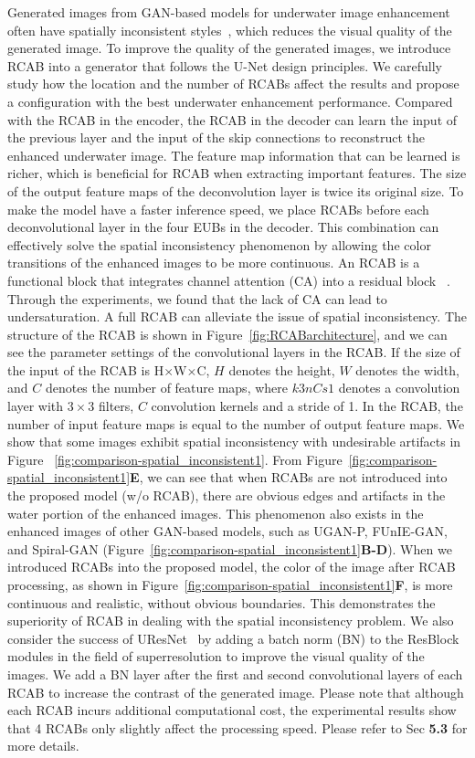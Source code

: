 \documentclass[utf8]{FrontiersinHarvard} %
\begin{document}
Generated images from GAN-based models for underwater image enhancement often have spatially inconsistent styles~\citep{2021LAFFNet}, which reduces the visual quality of the generated image. To improve the quality of the generated images, we introduce RCAB into a generator that follows the U-Net design principles. We carefully study how the location and the number of RCABs affect the results and propose a configuration with the best underwater enhancement performance. Compared with the RCAB in the encoder, the RCAB in the decoder can learn the input of the previous layer and the input of the skip connections to reconstruct the enhanced underwater image. The feature map information that can be learned is richer, which is beneficial for RCAB when extracting important features. 
The size of the output feature maps of the deconvolution layer is twice its original size. To make the model have a faster inference speed, we place RCABs before each deconvolutional layer in the four EUBs in the decoder. This combination can effectively solve the spatial inconsistency phenomenon by allowing the color transitions of the enhanced images to be more continuous. An RCAB is a functional block that integrates channel attention (CA) into a residual block ~\citep{zhang2018image}. Through the experiments, we found that the lack of CA can lead to undersaturation. A full RCAB can alleviate the issue of spatial inconsistency. The structure of the RCAB is shown in Figure~\ref{fig:RCABarchitecture}, and we can see the parameter settings of the convolutional layers in the RCAB. If the size of the input of the RCAB is H$\times$W$\times$C, $H$ denotes the height, $W$ denotes the width, and $C$ denotes the number of feature maps, where $k3nCs1$ denotes a convolution layer with $3\times3$ filters, $C$ convolution kernels and a stride of 1. In the RCAB, the number of input feature maps is equal to the number of output feature maps. We show that some images exhibit spatial inconsistency with undesirable artifacts in Figure ~\ref{fig:comparison-spatial_inconsistent1}. From Figure~\ref{fig:comparison-spatial_inconsistent1}\textbf{E}, we can see that when RCABs are not introduced into the proposed model (w/o RCAB), there are obvious edges and artifacts in the water portion of the enhanced images. This phenomenon also exists in the enhanced images of other GAN-based models, such as UGAN-P, FUnIE-GAN, and Spiral-GAN (Figure~\ref{fig:comparison-spatial_inconsistent1}\textbf{B-D}). When we introduced RCABs into the proposed model, the color of the image after RCAB processing, as shown in Figure~\ref{fig:comparison-spatial_inconsistent1}\textbf{F}, is more continuous and realistic, without obvious boundaries. This demonstrates the superiority of RCAB in dealing with the spatial inconsistency problem. We also consider the success of UResNet~\citep{2019Underwater} by adding a batch norm (BN) to the ResBlock modules in the field of superresolution to improve the visual quality of the images. We add a BN layer after the first and second convolutional layers of each RCAB to increase the contrast of the generated image. Please note that although each RCAB incurs additional computational cost, the experimental results show that 4 RCABs only slightly affect the processing speed. Please refer to Sec \textbf{5.3} for more details.
\end{document}
